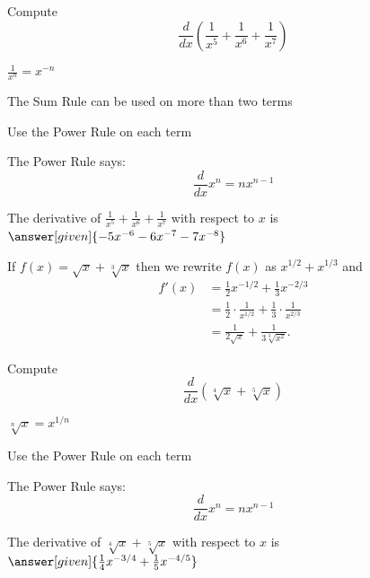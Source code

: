 \documentclass{ximera}
\begin{document}
\begin{problem} %
  Compute 
  \[
  \frac{d}{dx} \left(\frac{1}{x^5} + \frac{1}{x^6} + \frac{1}{x^7}\right)
  \]
  
    \begin{hint}
		 $\frac{1}{x^n} = x^{-n}$
		\end{hint}
		\begin{hint}
		  The Sum Rule can be used on more than two terms
		\end{hint}
		\begin{hint}
      Use the Power Rule on each term
    \end{hint}
    \begin{hint}
      The Power Rule says:
      \[
      \frac{d}{dx} x^n = nx^{n-1}
      \]
    \end{hint}    
		The derivative of $\frac{1}{x^5} + \frac{1}{x^6} + \frac{1}{x^7}$ with respect to $x$ is
		 $\answer[given]{-5x^{-6} -6x^{-7} - 7x^{-8}}$
	\
\end{problem}



\begin{example} %
 If $f(x) = \sqrt x + \sqrt[3] x$ then we rewrite $f(x)$ as $x^{1/2} + x^{1/3}$ and
\begin{align*}
f'(x) &= \tfrac12 x^{-1/2} + \tfrac13 x^{-2/3} \\
&= \tfrac12 \cdot \frac{1}{x^{1/2}} + \tfrac13 \cdot \frac{1}{x^{2/3}}\\
&= \frac{1}{2\sqrt x} + \frac{1}{3\sqrt[3] {x^2}}.
\end{align*}
\end{example}


\begin{problem} %
  Compute 
  \[
  \frac{d}{dx} \left(\sqrt[4] x + \sqrt[5] x\right)
  \]
  
    \begin{hint}
		 $\sqrt[n] x = x^{1/n}$
		\end{hint}
		\begin{hint}
      Use the Power Rule on each term
    \end{hint}
    \begin{hint}
      The Power Rule says:
      \[
      \frac{d}{dx} x^n = nx^{n-1}
      \]
    \end{hint}    
		The derivative of $\sqrt[4] x + \sqrt[5] x$ with respect to $x$ is
		 $\answer[given]{\frac14 x^{-3/4} + \frac15 x^{-4/5}}$
	
\end{problem}
\end{document}
